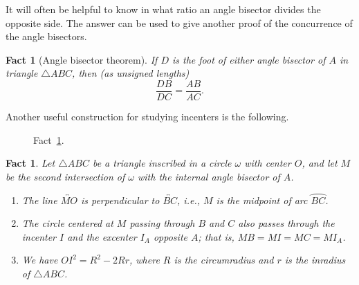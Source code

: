 \documentclass[12pt]{book}
\newcounter{exc}
\numberwithin{exc}{section}
\numberwithin{figure}{section}
\newtheorem{fact}[theorem]{Fact}
\numberwithin{equation}{theorem}
\def\ii{\item}
\def\line#1{\overleftrightarrow{#1}}
\def\arc#1{\wideparen{#1}}
\begin{document}
It will often be helpful to know in what ratio an angle bisector 
divides the opposite side. The answer can be used to give another proof of 
the concurrence of the angle bisectors. 
\begin{fact}[Angle bisector theorem]
If $D$ is the foot of either angle bisector of $A$ in triangle $\triangle
ABC$, then (as unsigned lengths)
\[
\frac{DB}{DC} = \frac{AB}{AC}.
\]
\end{fact}

Another useful construction for studying incenters is the following.
\begin{figure}
\caption{Fact~\ref{fact:midarc}.}
\end{figure}
\begin{fact} \label{fact:midarc}
Let $\triangle ABC$ be a triangle inscribed in a circle $\omega$ with center
$O$, and let $M$ be the second intersection of $\omega$ with the
internal angle bisector of $A$. 
\begin{enumerate}
\ii
The line $\line{MO}$ is perpendicular to $\line{BC}$, i.e.,
$M$ is the midpoint of arc $\arc{BC}$.
\ii
The circle centered at $M$ passing through $B$ and $C$ also passes 
through the incenter $I$ and the excenter $I_A$ opposite
$A$; that is, $MB = MI = MC = MI_A$.
\ii
We have $OI^2 = R^2 - 2Rr$, where $R$ is the circumradius and $r$ is
the inradius of $\triangle ABC$.
\end{enumerate}
\end{fact}
 
\end{document}
